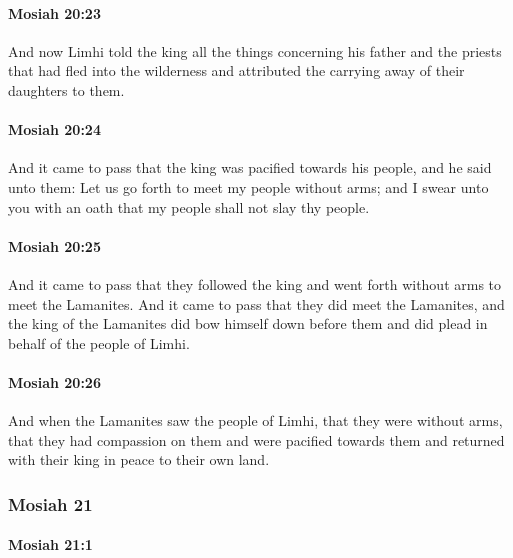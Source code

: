 		\paragraph{Mosiah 20:23} %
			\label{MOSIAH-20-23}

			And now Limhi told the king all the things
			concerning his father and the priests that had fled into the wilderness
			and attributed the carrying away of their daughters to them.

		\paragraph{Mosiah 20:24} %
			\label{MOSIAH-20-24}

			And it came to pass that the king was pacified towards his people,
			and he said unto them:
			Let us go forth to meet my people without arms;
			and I swear unto you with an oath
			that my people shall not slay thy people.

		\paragraph{Mosiah 20:25} %
			\label{MOSIAH-20-25}

			And it came to pass that they followed the king
			and went forth without arms to meet the Lamanites.
			And it came to pass that they did meet the Lamanites,
			and the king of the Lamanites did bow himself down before them
			and did plead in behalf of the people of Limhi.

		\paragraph{Mosiah 20:26} %
			\label{MOSIAH-20-26}

			And when the Lamanites saw the people of Limhi,
			that they were without arms,
			that they had compassion on them and were pacified towards them
			and returned with their king in peace to their own land.

	\subsubsection{Mosiah 21} %
		\label{MOSIAH-21}
		
		\paragraph{Mosiah 21:1} %
			\label{MOSIAH-21-1}

